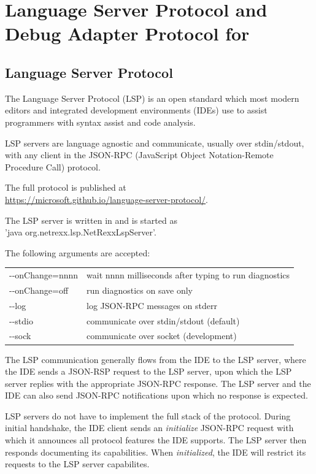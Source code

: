 \section{Language Server Protocol and Debug Adapter Protocol for \nr{}}

\subsection{Language Server Protocol}

The Language Server Protocol (LSP) is an open standard which most modern editors and 
integrated development environments (IDEs) use to assist programmers with syntax assist 
and code analysis.

LSP servers are language agnostic and communicate, usually over stdin/stdout, with any client 
in the JSON-RPC (JavaScript Object Notation-Remote Procedure Call) protocol.

The full protocol is published at \\ \url{https://microsoft.github.io/language-server-protocol/}.

The \nr{} LSP server is written in \nr{} and is started as \\ 'java org.netrexx.lsp.NetRexxLspServer'.

The following arguments are accepted:

\begin{tabular}{ l l }
-\/-onChange=nnnn & wait nnnn milliseconds after typing to run diagnostics \\
-\/-onChange=off & run diagnostics on save only \\
-\/-log & log JSON-RPC messages on stderr \\
-\/-stdio & communicate over stdin/stdout (default) \\
-\/-sock  & communicate over socket (development) \\
\end{tabular}

The LSP communication generally flows from the IDE to the LSP server, where the IDE sends a JSON-RSP request 
to the LSP server, upon which the LSP server replies with the appropriate JSON-RPC response. The LSP server 
and the IDE can also send JSON-RPC notifications upon which no response is expected.

LSP servers do not have to implement the full stack of the protocol.
During initial handshake, the IDE client sends an \emph{initialize} JSON-RPC request with which it announces all
protocol features the IDE supports. 
The LSP server then responds documenting its capabilities. When \emph{initialized}, the IDE will restrict its 
requests to the LSP server capabilites.

